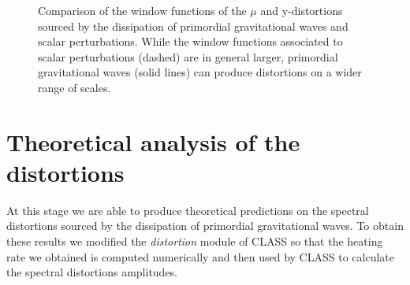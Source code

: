 \begin{figure}
    \centering
{}
\caption{Comparison of the window functions of the $\mu$ and y-distortions sourced by the dissipation of primordial gravitational waves and scalar perturbations. While the window functions associated to scalar perturbations (dashed) are in general larger, primordial gravitational waves (solid lines) can produce distortions on a wider range of scales.}
\label{fig:st_window}
\end{figure}

\section{Theoretical analysis of the distortions}
At this stage we are able to produce theoretical predictions on the spectral distortions sourced by the dissipation of primordial gravitational waves. To obtain these results we modified the \emph{distortion} module of CLASS so that the heating rate we obtained is computed numerically and then used by CLASS to calculate the spectral distortions amplitudes.


